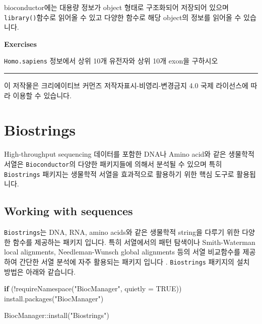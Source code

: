 \documentclass[
]{book}
\newenvironment{Shaded}{\begin{snugshade}}{\end{snugshade}}
\newcommand{\AttributeTok}[1]{\textcolor[rgb]{0.77,0.63,0.00}{#1}}
\newcommand{\ConstantTok}[1]{\textcolor[rgb]{0.00,0.00,0.00}{#1}}
\newcommand{\ControlFlowTok}[1]{\textcolor[rgb]{0.13,0.29,0.53}{\textbf{#1}}}
\newcommand{\FunctionTok}[1]{\textcolor[rgb]{0.00,0.00,0.00}{#1}}
\newcommand{\NormalTok}[1]{#1}
\newcommand{\SpecialCharTok}[1]{\textcolor[rgb]{0.00,0.00,0.00}{#1}}
\newcommand{\StringTok}[1]{\textcolor[rgb]{0.31,0.60,0.02}{#1}}
\begin{document}
bioconductor에는 대용량 정보가 object 형태로 구조화되어 저장되어 있으며 \texttt{library()}함수로 읽어올 수 있고 다양한 함수로 해당 object의 정보를 읽어올 수 있습니다.

\textbf{Exercises }

\texttt{Homo.sapiens} 정보에서 상위 10개 유전자와 상위 10개 exon을 구하시오

\begin{center}\rule{0.5\linewidth}{0.5pt}\end{center}

이 저작물은 크리에이티브 커먼즈 저작자표시-비영리-변경금지 4.0 국제 라이선스에 따라 이용할 수 있습니다.

\hypertarget{biostrings}{%
\chapter{Biostrings}\label{biostrings}}

High-throughput sequencing 데이터를 포함한 DNA나 Amino acid와 같은 생물학적 서열은 \texttt{Bioconductor}의 다양한 패키지들에 의해서 분석될 수 있으며 특히 \texttt{Biostrings} 패키지는 생물학적 서열을 효과적으로 활용하기 위한 핵심 도구로 활용됩니다.

\hypertarget{working-with-sequences}{%
\section{Working with sequences}\label{working-with-sequences}}

\texttt{Biostrings}는 DNA, RNA, amino acids와 같은 생물학적 string을 다루기 위한 다양한 함수를 제공하는 패키지 입니다. 특히 서열에서의 패턴 탐색이나 Smith-Waterman local alignments, Needleman-Wunsch global alignments 등의 서열 비교함수를 제공하여 간단한 서열 분석에 자주 활용되는 패키지 입니다 \citep{sippl1999biological}. \texttt{Biostrings} 패키지의 설치 방법은 아래와 같습니다.

\begin{Shaded}
\begin{Highlighting}[]
\ControlFlowTok{if}\NormalTok{ (}\SpecialCharTok{!}\FunctionTok{requireNamespace}\NormalTok{(}\StringTok{"BiocManager"}\NormalTok{, }\AttributeTok{quietly =} \ConstantTok{TRUE}\NormalTok{))}
    \FunctionTok{install.packages}\NormalTok{(}\StringTok{"BiocManager"}\NormalTok{)}

\NormalTok{BiocManager}\SpecialCharTok{::}\FunctionTok{install}\NormalTok{(}\StringTok{"Biostrings"}\NormalTok{)}
\end{Highlighting}
\end{Shaded}
\end{document}
